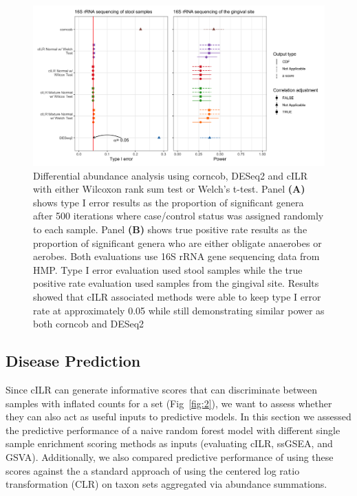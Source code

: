 \documentclass[10pt,letterpaper]{article}
\begin{document}
\begin{figure}[!ht]
    \centering
    \includegraphics[width = \textwidth]{figures/data_diff_ab.png}
    \caption{Differential abundance analysis using corncob, DESeq2 and cILR with either Wilcoxon rank sum test or Welch's t-test. Panel \textbf{(A)} shows type I error results as the proportion of significant genera after 500 iterations where case/control status was assigned randomly to each sample. Panel \textbf{(B)} shows true positive rate results as the proportion of significant genera who are either obligate anaerobes or aerobes. Both evaluations use 16S rRNA gene sequencing data from HMP. Type I error evaluation used stool samples while the true positive rate evaluation used samples from the gingival site. Results showed that cILR associated methods were able to keep type I error rate at approximately 0.05 while still demonstrating similar power as both corncob and DESeq2} 
    \label{fig:5}
\end{figure}

\subsection*{Disease Prediction}   
Since cILR can generate informative scores that can discriminate between samples with inflated counts for a set (Fig~\ref{fig:2}), we want to assess whether they can also act as useful inputs to predictive models. In this section we assessed the predictive performance of a naive random forest model \cite{breiman2001} with different single sample enrichment scoring methods as inputs (evaluating cILR, ssGSEA, and GSVA). Additionally, we also compared predictive performance of using these scores against the a standard approach of using the centered log ratio transformation (CLR) on taxon sets aggregated via abundance summations.     
\end{document}
